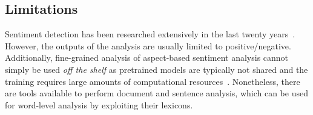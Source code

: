 \subsection{\statusgreen Limitations}

Sentiment detection has been researched extensively in the last twenty years~\citep{medhat2014sentiment}.
However, the outputs of the analysis are usually limited to positive/negative.
Additionally, fine-grained analysis of aspect-based sentiment analysis cannot simply be used \emph{off the shelf} as pretrained models are typically not shared and the training requires large amounts of computational resources~\citep{brauwers2022survey}.
Nonetheless, there are tools available to perform document and sentence analysis, which can be used for word-level analysis by exploiting their lexicons.

